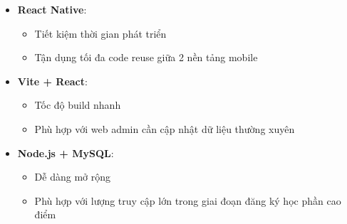 \documentclass[../main.tex]{subfiles}
\begin{document}
\begin{itemize}
    \item \textbf{React Native}: 
    \begin{itemize}
        \item Tiết kiệm thời gian phát triển
        \item Tận dụng tối đa code reuse giữa 2 nền tảng mobile
    \end{itemize}
    
    \item \textbf{Vite + React}:
    \begin{itemize}
        \item Tốc độ build nhanh
        \item Phù hợp với web admin cần cập nhật dữ liệu thường xuyên
    \end{itemize}
    
    \item \textbf{Node.js + MySQL}:
    \begin{itemize}
        \item Dễ dàng mở rộng
        \item Phù hợp với lượng truy cập lớn trong giai đoạn đăng ký học phần cao điểm
    \end{itemize}
\end{itemize}
\end{document}

